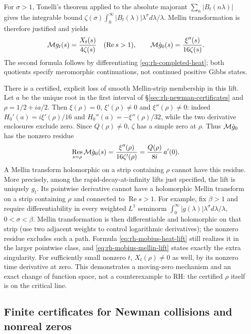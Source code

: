 For $\sigma>1$, Tonelli's theorem applied to the absolute majorant
$\sum_n|B_t(n\lambda)|$ gives the integrable bound
$\zeta(\sigma)\int_0^\infty|B_t(\lambda)|\lambda^\sigma
d\lambda/\lambda$. Mellin transformation is therefore justified and
yields
\begin{equation}
 {\cal M}g_t(s)=\frac{X_t(s)}{4\zeta(s)}
 \quad(\operatorname{Re}s>1),\qquad
 {\cal M}\dot g_0(s)=\frac{\xi''(s)}{16\zeta(s)}.
 \label{eq:rh-mobius-mellin-lift}
\end{equation}
The second formula follows by differentiating
\eqref{eq:rh-completed-heat}; both quotients specify meromorphic
continuations, not continued positive Gibbs states.

There is a certified, explicit loss of smooth Mellin-strip membership
in this lift. Let $a$ be the unique root in the first interval of
\S\ref{sec:rh-newman-certificates} and $\rho=1/2+ia/2$.
Then $\xi(\rho)=0$, $\xi'(\rho)\ne0$ and $\xi''(\rho)\ne0$:
indeed $H_0'(a)=i\xi'(\rho)/16$ and
$H_0''(a)=-\xi''(\rho)/32$, while the two derivative enclosures
exclude zero. Since $Q(\rho)\ne0$, $\zeta$ has a simple zero at $\rho$.
Thus ${\cal M}\dot g_0$ has the nonzero residue
\begin{equation}
 \operatorname*{Res}_{s=\rho}{\cal M}\dot g_0(s)
 =\frac{\xi''(\rho)}{16\zeta'(\rho)}
 =\frac{Q(\rho)}{8i}\,a'(0).
 \label{eq:rh-lift-residue}
\end{equation}
A Mellin transform holomorphic on a strip containing $\rho$ cannot
have this residue. More precisely, among the rapid-decay-at-infinity
lifts just specified, the lift is uniquely $g_t$. Its pointwise
derivative cannot have a holomorphic Mellin transform on a strip
containing $\rho$ and connected to $\operatorname{Re}s>1$.
For example, fix $\beta>1$ and require differentiability in every
weighted $L^1$ seminorm
$\int_0^\infty |g(\lambda)|\lambda^\sigma d\lambda/\lambda$,
$0<\sigma<\beta$. Mellin transformation is then differentiable
and holomorphic on that strip (use two adjacent weights to control
logarithmic derivatives); the nonzero residue excludes such a path.
Formula \eqref{eq:rh-mobius-heat-lift} still realizes it in
the larger pointwise class, and
\eqref{eq:rh-mobius-mellin-lift} states exactly the extra singularity.
For sufficiently small nonzero $t$, $X_t(\rho)\ne0$ as well, by its
nonzero time derivative at zero. This demonstrates a moving-zero
mechanism and an exact change of function space, not a counterexample
to RH: the certified $\rho$ itself is on the critical line.

\subsection{Finite certificates for Newman collisions and nonreal zeros}
\label{sec:rh-newman-finite-tests}


